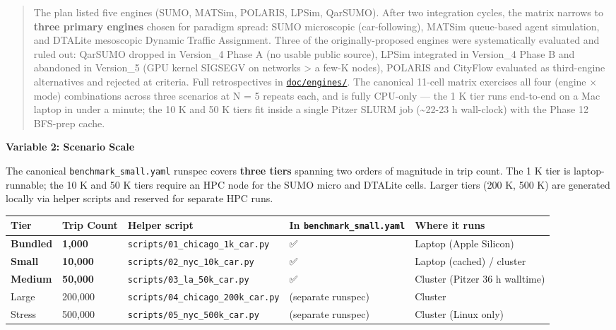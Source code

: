\begin{quote}
The plan listed five engines (SUMO, MATSim, POLARIS, LPSim,
QarSUMO). After two integration cycles, the matrix narrows to
\textbf{three primary engines} chosen for paradigm spread: SUMO
microscopic (car-following), MATSim queue-based agent simulation, and
DTALite mesoscopic Dynamic Traffic Assignment. Three of the
originally-proposed engines were systematically evaluated and ruled out:
QarSUMO dropped in Version\_4 Phase A (no usable public source), LPSim
integrated in Version\_4 Phase B and abandoned in Version\_5 (GPU kernel
SIGSEGV on networks \textgreater{} a few-K nodes), POLARIS and CityFlow
evaluated as third-engine alternatives and rejected at criteria. Full
retrospectives in \href{../engines/}{\texttt{doc/engines/}}. The
canonical 11-cell matrix exercises all four (engine × mode) combinations
across three scenarios at N = 5 repeats each, and is fully CPU-only ---
the 1 K tier runs end-to-end on a Mac laptop in under a minute; the 10 K
and 50 K tiers fit inside a single Pitzer SLURM job
(\textasciitilde22-23 h wall-clock) with the Phase 12 BFS-prep cache.
\end{quote}

\textbf{Variable 2: Scenario Scale}

The canonical \texttt{benchmark\_small.yaml} runspec covers
\textbf{three tiers} spanning two orders of magnitude in trip count. The
1 K tier is laptop-runnable; the 10 K and 50 K tiers require an HPC node
for the SUMO micro and DTALite cells. Larger tiers (200 K, 500 K) are
generated locally via helper scripts and reserved for separate HPC runs.

\begin{longtable}[]{@{}lllll@{}}
\toprule\noalign{}
Tier & Trip Count & Helper script & In \texttt{benchmark\_small.yaml} &
Where it runs \\
\midrule\noalign{}
\endhead
\bottomrule\noalign{}
\endlastfoot
\textbf{Bundled} & \textbf{1,000} &
\texttt{scripts/01\_chicago\_1k\_car.py} & ✅ & Laptop (Apple
Silicon) \\
\textbf{Small} & \textbf{10,000} & \texttt{scripts/02\_nyc\_10k\_car.py}
& ✅ & Laptop (cached) / cluster \\
\textbf{Medium} & \textbf{50,000} & \texttt{scripts/03\_la\_50k\_car.py}
& ✅ & Cluster (Pitzer 36 h walltime) \\
Large & 200,000 & \texttt{scripts/04\_chicago\_200k\_car.py} & (separate
runspec) & Cluster \\
Stress & 500,000 & \texttt{scripts/05\_nyc\_500k\_car.py} & (separate
runspec) & Cluster (Linux only) \\
\end{longtable}

